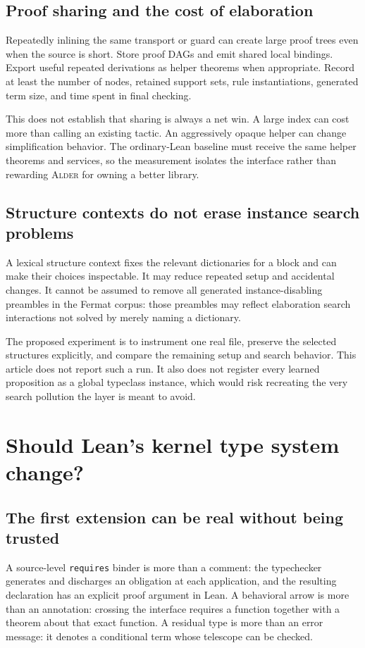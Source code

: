 \documentclass[11pt,a4paper]{article}
\newcommand{\code}[1]{\nolinkurl{#1}}
\newcommand{\Alder}{\textsc{Alder}}
\theoremstyle{plain}
\theoremstyle{definition}
\theoremstyle{remark}
\begin{document}
\subsection{Proof sharing and the cost of elaboration}
Repeatedly inlining the same transport or guard can create large proof trees even when the source is short. Store proof DAGs and emit shared local bindings. Export useful repeated derivations as helper theorems when appropriate. Record at least the number of nodes, retained support sets, rule instantiations, generated term size, and time spent in final checking.

This does not establish that sharing is always a net win. A large index can cost more than calling an existing tactic. An aggressively opaque helper can change simplification behavior. The ordinary-Lean baseline must receive the same helper theorems and services, so the measurement isolates the interface rather than rewarding \Alder{} for owning a better library.

\subsection{Structure contexts do not erase instance search problems}
A lexical structure context fixes the relevant dictionaries for a block and can make their choices inspectable. It may reduce repeated setup and accidental changes. It cannot be assumed to remove all generated instance-disabling preambles in the Fermat corpus: those preambles may reflect elaboration search interactions not solved by merely naming a dictionary.

The proposed experiment is to instrument one real file, preserve the selected structures explicitly, and compare the remaining setup and search behavior. This article does not report such a run. It also does not register every learned proposition as a global typeclass instance, which would risk recreating the very search pollution the layer is meant to avoid.

\section{Should Lean's kernel type system change?}\label{sec:kernel}

\subsection{The first extension can be real without being trusted}
A source-level \code{requires} binder is more than a comment: the typechecker generates and discharges an obligation at each application, and the resulting declaration has an explicit proof argument in Lean. A behavioral arrow is more than an annotation: crossing the interface requires a function together with a theorem about that exact function. A residual type is more than an error message: it denotes a conditional term whose telescope can be checked.
\end{document}

